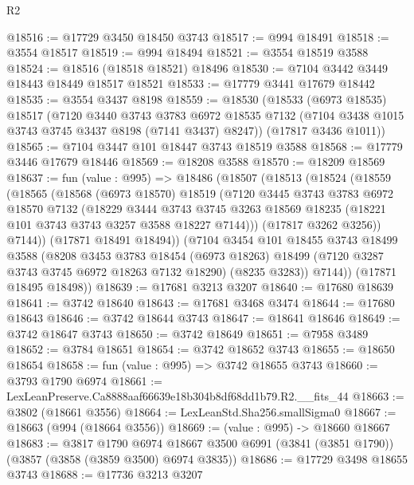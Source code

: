 \begin{lexlean}{R2}
\begin{coremodule}
@18516 := @17729 @3450 @18450 @3743
@18517 := @994 @18491
@18518 := @3554 @18517
@18519 := @994 @18494
@18521 := @3554 @18519 @3588
@18524 := @18516 (@18518 @18521) @18496
@18530 := @7104 @3442 @3449 @18443 @18449 @18517 @18521
@18533 := @17779 @3441 @17679 @18442
@18535 := @3554 @3437 @8198
@18559 := @18530
    (@18533
      (@6973 @18535)
      @18517
      (@7120
        @3440
        @3743
        @3783
        @6972
        @18535
        @7132
        (@7104 @3438 @1015 @3743 @3745 @3437 @8198 (@7141 @3437) @8247))
      (@17817 @3436 @1011))
@18565 := @7104 @3447 @101 @18447 @3743 @18519 @3588
@18568 := @17779 @3446 @17679 @18446
@18569 := @18208 @3588
@18570 := @18209 @18569
@18637 := fun (value : @995) =>
  @18486
    (@18507
      (@18513
        (@18524
          (@18559
            (@18565
              (@18568
                (@6973 @18570)
                @18519
                (@7120
                  @3445
                  @3743
                  @3783
                  @6972
                  @18570
                  @7132
                  (@18229
                    @3444
                    @3743
                    @3745
                    @3263
                    @18569
                    @18235
                    (@18221 @101 @3743 @3743 @3257 @3588 @18227 @7144)))
                (@17817 @3262 @3256))
              @7144))
          (@17871 @18491 @18494))
        (@7104
          @3454
          @101
          @18455
          @3743
          @18499
          @3588
          (@8208
            @3453
            @3783
            @18454
            (@6973 @18263)
            @18499
            (@7120 @3287 @3743 @3745 @6972 @18263 @7132 @18290)
            (@8235 @3283))
          @7144))
      (@17871 @18495 @18498))
@18639 := @17681 @3213 @3207
@18640 := @17680 @18639
@18641 := @3742 @18640
@18643 := @17681 @3468 @3474
@18644 := @17680 @18643
@18646 := @3742 @18644 @3743
@18647 := @18641 @18646
@18649 := @3742 @18647 @3743
@18650 := @3742 @18649
@18651 := @7958 @3489
@18652 := @3784 @18651
@18654 := @3742 @18652 @3743
@18655 := @18650 @18654
@18658 := fun (value : @995) => @3742 @18655 @3743
@18660 := @3793 @1790 @6974
@18661 := LexLeanPreserve.Ca8888aaf66639e18b304b8df68dd1b79.R2.__fits_44
@18663 := @3802 (@18661 @3556)
@18664 := LexLeanStd.Sha256.smallSigma0
@18667 := @18663 (@994 (@18664 @3556))
@18669 := (value : @995) -> @18660 @18667
@18683 := @3817
    @1790
    @6974
    @18667
    @3500
    @6991
    (@3841 (@3851 @1790))
    (@3857 (@3858 (@3859 @3500) @6974 @3835))
@18686 := @17729 @3498 @18655 @3743
@18688 := @17736 @3213 @3207

\end{coremodule}
\end{lexlean}
